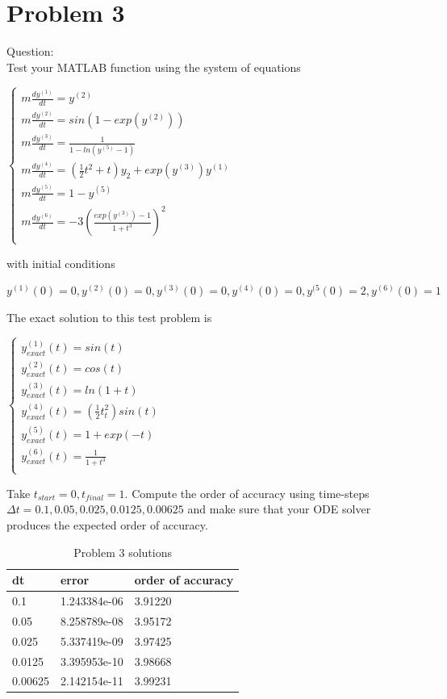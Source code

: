 \documentclass[12pt]{article}
\begin{document}
\newpage
\section{Problem 3}\label{sec::Problem 3}
Question:\\
Test your MATLAB function using the system of equations
\begin{center}
$\begin{cases} 
m\frac{ dy^{(1)} }{dt} =y^{(2)}  \\
m\frac{ dy^{(2)} }{dt} =sin(1-exp(y^{(2)} )) \\
m\frac{ dy^{(3)} }{dt} =\frac{1}{1-ln(y^{(5)}-1)}  \\
m\frac{ dy^{(4)} }{dt} =(\frac{1}{2}t^2 + t)y_2 + exp(y^{(3)})y^{(1)}  \\
m\frac{ dy^{(5)} }{dt} =1-y^{(5)}  \\
m\frac{ dy^{(6)} }{dt} =-3(\frac{exp(y^{(3)})-1}{1+t^3})^2  \\
 \end{cases}$
\end{center}
with initial conditions\\
\begin{center}
$y^{(1)}(0)=0, y^{(2)}(0)=0, y^{(3)}(0)=0, y^{(4)}(0)=0, y^{(5}(0)=2, y^{(6)}(0)=1$
\end{center}
The exact solution to this test problem is
\begin{center}
$\begin{cases} 
y_{exact}^{(1)}(t) = sin(t)  \\
y_{exact}^{(2)}(t) = cos(t)  \\
y_{exact}^{(3)}(t) = ln(1+t)  \\
y_{exact}^{(4)}(t) = (\frac{1}{2}t^2 _ t)sin(t)  \\
y_{exact}^{(5)}(t) = 1 + exp(-t)  \\
y_{exact}^{(6)}(t) = \frac{1}{1+t^3}  \\
 \end{cases}$
\end{center}
Take $t_{start} = 0, t_{final} = 1$. Compute the order of accuracy using time-steps\\ $\Delta t = 0.1, 0.05, 0.025, 0.0125, 0.00625$ and make sure that your ODE solver produces the expected order of accuracy.

\begin{table}[bht]
\centering

\begin{tabular}{|l|l|l|}
\hline
dt      & error        & order of accuracy \\ \hline
0.1 & 1.243384e-06 & 3.91220           \\ \hline
0.05 & 8.258789e-08  & 3.95172          \\ \hline
0.025 &5.337419e-09  &3.97425           \\ \hline
0.0125 &3.395953e-10  & 3.98668           \\ \hline
0.00625 & 2.142154e-11 & 3.99231           \\ \hline

\end{tabular}
\caption{Problem 3 solutions}
\label{problem 3}
\end{table}
\end{document}
